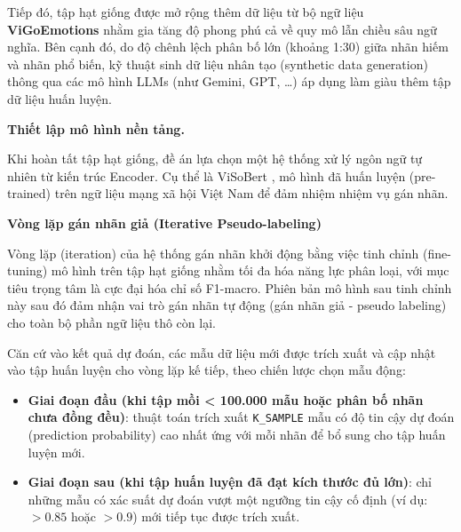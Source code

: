 Tiếp đó, tập hạt giống được mở rộng thêm dữ liệu từ bộ ngữ liệu \textbf{ViGoEmotions} nhằm gia tăng độ phong phú cả về quy mô lẫn chiều sâu ngữ nghĩa. Bên cạnh đó, do độ chênh lệch phân bố lớn (khoảng 1:30) giữa nhãn hiếm và nhãn phổ biến, kỹ thuật sinh dữ liệu nhân tạo (synthetic data generation) thông qua các mô hình LLMs (như Gemini, GPT, \dots) áp dụng làm giàu thêm tập dữ liệu huấn luyện.

\textbf{Thiết lập mô hình nền tảng.}

Khi hoàn tất tập hạt giống, đề án lựa chọn một hệ thống xử lý ngôn ngữ tự nhiên từ kiến trúc Encoder. Cụ thể là ViSoBert \parencite{nguyen2023visobert}, mô hình đã huấn luyện (pre-trained) trên ngữ liệu mạng xã hội Việt Nam để đảm nhiệm nhiệm vụ gán nhãn.

\textbf{Vòng lặp gán nhãn giả (Iterative Pseudo-labeling)}

Vòng lặp (iteration) của hệ thống gán nhãn khởi động bằng việc tinh chỉnh (fine-tuning) mô hình trên tập hạt giống nhằm tối đa hóa năng lực phân loại, với mục tiêu trọng tâm là cực đại hóa chỉ số F1-macro. Phiên bản mô hình sau tinh chỉnh này sau đó đảm nhận vai trò gán nhãn tự động (gán nhãn giả - pseudo labeling) cho toàn bộ phần ngữ liệu thô còn lại.

Căn cứ vào kết quả dự đoán, các mẫu dữ liệu mới được trích xuất và cập nhật vào tập huấn luyện cho vòng lặp kế tiếp, theo chiến lược chọn mẫu động:

\begin{itemize}[label=-]
    \item \textbf{Giai đoạn đầu (khi tập mồi < 100.000 mẫu hoặc phân bố nhãn chưa đồng đều)}: thuật toán trích xuất \texttt{K\_SAMPLE} mẫu có độ tin cậy dự đoán (prediction probability) cao nhất ứng với mỗi nhãn để bổ sung cho tập huấn luyện mới.
    \item \textbf{Giai đoạn sau (khi tập huấn luyện đã đạt kích thước đủ lớn)}: chỉ những mẫu có xác suất dự đoán vượt một ngưỡng tin cậy cố định (ví dụ: $> 0.85$ hoặc $> 0.9$) mới tiếp tục được trích xuất.
\end{itemize}

